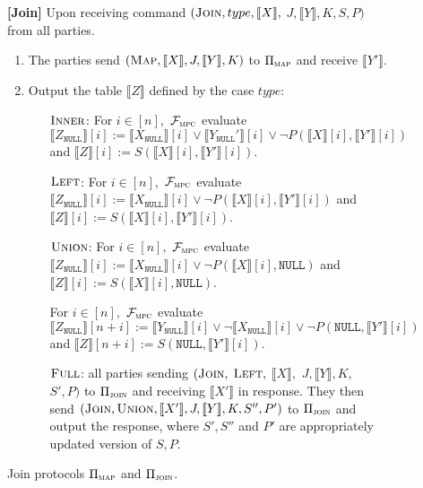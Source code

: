 \documentclass[11pt,letterpaper]{article}
\newcommand{\share}[1]{\ensuremath{\llbracket #1\rrbracket}\xspace}
\newcommand{\Null}{\texttt{NULL}\xspace}
\newcommand{\XNull}{\ensuremath{X_\Null}\xspace}
\newcommand{\YNull}{\ensuremath{Y_\Null}\xspace}
\newcommand{\ZNull}{\ensuremath{Z_\Null}\xspace}
\newcommand{\f}[1]{\ensuremath{\mathcal{F}_{\textsc{#1}}}}
\newcommand{\proto}[1]{\ensuremath{\Pi_{\textsc{#1}}}}
\begin{document}
\begin{figure}
{\begin{minipage}{0.95\linewidth}
			{\bf [Join]}  Upon receiving command $(\textsc{Join}, type, \share{X},$ $J, \share{Y}, K, S, P)$ from all parties.
			\begin{enumerate}[leftmargin=.5cm]
				\item The parties send $(\textsc{Map},\share{X},J, \share{Y}, K)$ to \proto{map} and receive $\share{{Y'}}$.
								
				\item Output the table $\share{Z}$ defined by the case $type$:
				\begin{enumerate}[leftmargin=0.6cm]
					\item[$\textsc{Inner}$:] For $i\in [n],$  \f{mpc} evaluate $\share{\ZNull}[i]:=\share{\XNull}[i] \vee \share{\YNull'}[i] \vee \neg P(\share{X}[i], \share{Y'}[i])$ and $\share{Z}[i]:=S(\share{X}[i], \share{Y'}[i])$.
					
					
					\item[$\textsc{Left}$:]
					For $i\in [n],$ \f{mpc} evaluate $\share{\ZNull}[i]:=\share{\XNull}[i] \vee \neg P(\share{X}[i], \share{Y'}[i])$ and $\share{Z}[i]:=S(\share{X}[i], \share{Y'}[i])$.
					
					
					\item[$\textsc{Union}$:] 
					For $i\in [n],$ \f{mpc} evaluate $\share{\ZNull}[i]:= \share{\XNull}[i] \vee \neg P(\share{X}[i], \Null)$ and $\share{Z}[i]:=S(\share{X}[i], \Null)$. 
					
					For $i\in [n],$ \f{mpc} evaluate $\share{\ZNull}[n+i]:= \share{\YNull}[i] \vee \neg \share{\XNull}[i] \vee \neg P(\Null, \share{Y'}[i])$ and $\share{Z}[n+i]:=S(\Null, \share{Y'}[i])$.
					
					\item[$\textsc{Full}$:] all parties sending $(\textsc{Join},$ $\textsc{Left},$ $\share{X},$ $J, \share{Y}, K,$ $S', P)$ to $\proto{join}$ and receiving $\share{X'}$ in response. They then send $(\textsc{Join}, \textsc{Union}, \share{X'}, J, \share{Y}, K, S'', P')$  to $\proto{join}$ and output the response, where $S',S''$ and $P'$ are appropriately updated version of $S,P$.
				\end{enumerate}
				 

			\end{enumerate}
	\end{minipage}}
\vspace{-0.3cm}
	\caption{Join protocols $\proto{map}$ and $\proto{join}$.}
	\label{fig:full_proto}	
	\vspace{-0.3cm}
\end{figure}
\end{document}
